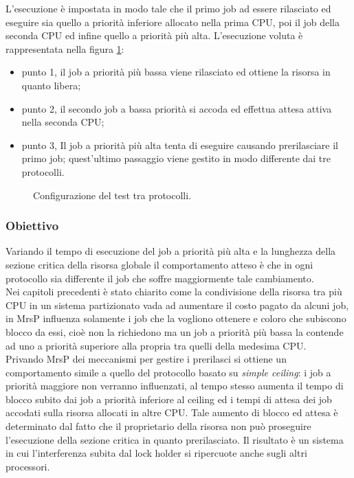 \noindent L'esecuzione è impostata in modo tale che il primo job ad essere rilasciato ed eseguire sia quello a priorità inferiore allocato nella prima CPU, poi il job della seconda CPU ed infine quello a priorità più alta. L'esecuzione voluta è rappresentata nella figura \ref{fig:test_protocols}: 

\begin{itemize}
  \item punto {\color{red} 1}, il job a priorità più bassa viene rilasciato ed ottiene la risorsa in quanto libera;
  \item punto {\color{red} 2}, il secondo job a bassa priorità si accoda ed effettua attesa attiva nella seconda CPU;
  \item punto {\color{red} 3}, Il job a priorità più alta tenta di eseguire causando prerilasciare il primo job; quest'ultimo passaggio viene gestito in modo differente dai tre protocolli.\\
\end{itemize}

\begin{figure}
\centering
{}
\caption{Configurazione del test tra protocolli.}
\label{fig:test_protocols}
\end{figure}

\subsubsection{Obiettivo}
\label{sec:confronto_protocolli_ob}

\noindent Variando il tempo di esecuzione del job a priorità più alta e la lunghezza della sezione critica della risorsa globale il comportamento atteso è che in ogni protocollo sia differente il job che soffre maggiormente tale cambiamento.\\

\noindent Nei capitoli precedenti è stato chiarito come la condivisione della risorsa tra più CPU in un sistema partizionato vada ad aumentare il costo pagato da alcuni job, in MrsP influenza solamente i job che la vogliono ottenere e coloro che subiscono blocco da essi, cioè non la richiedono ma un job a priorità più bassa la contende ad uno a priorità superiore alla propria tra quelli della medesima CPU.\\

\noindent Privando MrsP dei meccanismi per gestire i prerilasci si ottiene un comportamento simile a quello del protocollo basato su \textit{simple ceiling}: i job a priorità maggiore non verranno influenzati, al tempo stesso aumenta il tempo di blocco subito dai job a priorità inferiore al ceiling ed i tempi di attesa dei job accodati sulla risorsa allocati in altre CPU. Tale aumento di blocco ed attesa è determinato dal fatto che il proprietario della risorsa non può proseguire l'esecuzione della sezione critica in quanto prerilasciato. Il risultato è un sistema in cui l'interferenza subita dal lock holder si ripercuote anche sugli altri processori.\\

